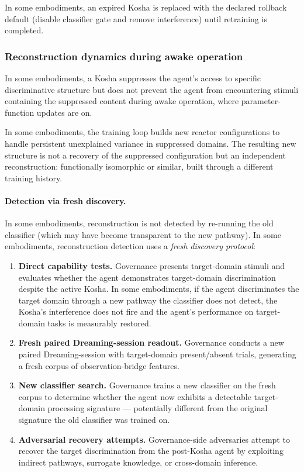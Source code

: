 \documentclass[a4paper,12pt]{article}
\begin{document}
In some embodiments, an expired Kosha is replaced with the declared
rollback default (disable classifier gate and remove interference)
until retraining is completed.

\subsubsection{Reconstruction dynamics during awake operation}
\label{sec:reconstruction}

In some embodiments, a Kosha suppresses the agent's access to
specific discriminative structure but does not prevent the agent
from encountering stimuli containing the suppressed content during
awake operation, where parameter-function updates are on.

In some embodiments, the training loop builds new reactor
configurations to handle persistent unexplained variance in
suppressed domains. The resulting new structure is not a recovery of
the suppressed configuration but an independent reconstruction:
functionally isomorphic or similar, built through a different
training history.

\paragraph{Detection via fresh discovery.}
In some embodiments, reconstruction is not detected by re-running
the old classifier (which may have become transparent to the new
pathway). In some embodiments, reconstruction detection uses a
\emph{fresh discovery protocol}:

\begin{enumerate}
  \item \textbf{Direct capability tests.} Governance presents
    target-domain stimuli and evaluates whether the agent demonstrates
    target-domain discrimination despite the active Kosha. In some
    embodiments, if the agent discriminates the target domain through
    a new pathway the classifier does not detect, the Kosha's
    interference does not fire and the agent's performance on
    target-domain tasks is measurably restored.
  \item \textbf{Fresh paired Dreaming-session readout.} Governance conducts a
    new paired Dreaming-session with target-domain
    present/absent trials, generating a fresh corpus of
    observation-bridge features.
  \item \textbf{New classifier search.} Governance trains a new
    classifier on the fresh corpus to determine whether the agent now
    exhibits a detectable target-domain processing signature ---
    potentially different from the original signature the old
    classifier was trained on.
  \item \textbf{Adversarial recovery attempts.} Governance-side
    adversaries attempt to recover the target discrimination from the
    post-Kosha agent by exploiting indirect pathways, surrogate
    knowledge, or cross-domain inference.
\end{enumerate}
\end{document}
